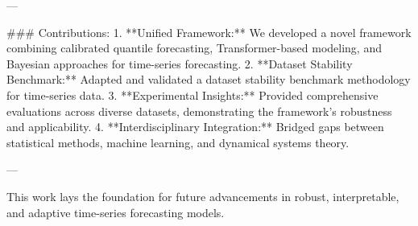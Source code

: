 ---

### Contributions:
1. **Unified Framework:** We developed a novel framework combining calibrated quantile forecasting, Transformer-based modeling, and Bayesian approaches for time-series forecasting.
2. **Dataset Stability Benchmark:** Adapted and validated a dataset stability benchmark methodology for time-series data.
3. **Experimental Insights:** Provided comprehensive evaluations across diverse datasets, demonstrating the framework's robustness and applicability.
4. **Interdisciplinary Integration:** Bridged gaps between statistical methods, machine learning, and dynamical systems theory.

--- 

This work lays the foundation for future advancements in robust, interpretable, and adaptive time-series forecasting models.